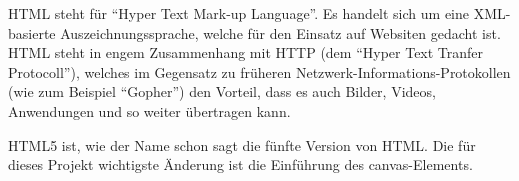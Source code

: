 HTML steht für \enquote{Hyper Text Mark-up Language}. Es handelt sich um eine XML-basierte Auszeichnungssprache, welche für den Einsatz auf Websiten gedacht ist.\\
HTML steht in engem Zusammenhang mit HTTP (dem \enquote{Hyper Text Tranfer Protocoll}), welches im Gegensatz zu früheren Netzwerk-Informations-Protokollen (wie zum Beispiel \enquote{Gopher}) den Vorteil, dass es auch Bilder, Videos, Anwendungen und so weiter übertragen kann.

HTML5 ist, wie der Name schon sagt die fünfte Version von HTML. Die für dieses Projekt wichtigste Änderung ist die Einführung des canvas-Elements.